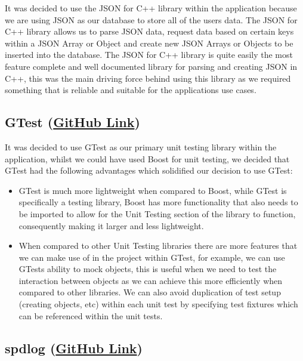 \documentclass[
  english,
  a4paper,
,tablecaptionabove
]{scrartcl}
\providecommand{\tightlist}{%
  \setlength{\itemsep}{0pt}\setlength{\parskip}{0pt}}
\begin{document}
It was decided to use the JSON for C++ library within the application
because we are using JSON as our database to store all of the users
data. The JSON for C++ library allows us to parse JSON data, request
data based on certain keys within a JSON Array or Object and create new
JSON Arrays or Objects to be inserted into the database. The JSON for
C++ library is quite easily the most feature complete and well
documented library for parsing and creating JSON in C++, this was the
main driving force behind using this library as we required something
that is reliable and suitable for the applications use cases.

\hypertarget{gtest-github-link}{%
\subsection{\texorpdfstring{GTest
(\href{https://github.com/google/googletest}{GitHub
Link})}{GTest (GitHub Link)}}\label{gtest-github-link}}

It was decided to use GTest as our primary unit testing library within
the application, whilst we could have used Boost for unit testing, we
decided that GTest had the following advantages which solidified our
decision to use GTest:

\begin{itemize}
\tightlist
\item
  GTest is much more lightweight when compared to Boost, while GTest is
  specifically a testing library, Boost has more functionality that also
  needs to be imported to allow for the Unit Testing section of the
  library to function, consequently making it larger and less
  lightweight.
\item
  When compared to other Unit Testing libraries there are more features
  that we can make use of in the project within GTest, for example, we
  can use GTests ability to mock objects, this is useful when we need to
  test the interaction between objects as we can achieve this more
  efficiently when compared to other libraries. We can also avoid
  duplication of test setup (creating objects, etc) within each unit
  test by specifying test fixtures which can be referenced within the
  unit tests.
\end{itemize}

\hypertarget{spdlog-github-link}{%
\subsection{\texorpdfstring{spdlog
(\href{https://github.com/gabime/spdlog}{GitHub
Link})}{spdlog (GitHub Link)}}\label{spdlog-github-link}}
\end{document}
